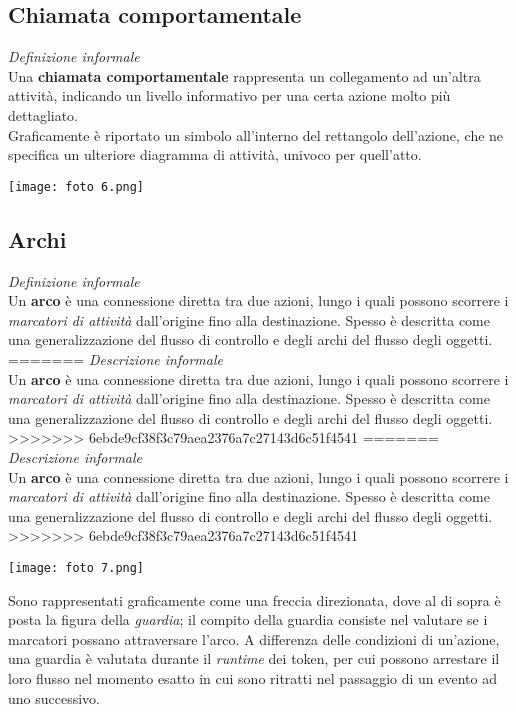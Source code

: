 \documentclass{article}
\begin{document}
\subsection*{Chiamata comportamentale}
\large
\textit{Definizione informale}\\Una \textbf{chiamata comportamentale} rappresenta un collegamento ad un'altra attività, indicando un livello informativo per una certa azione molto più dettagliato.\vspace*{14pt}\\
Graficamente è riportato un simbolo all'interno del rettangolo dell'azione, che ne specifica un ulteriore diagramma di attività, univoco per quell'atto.\\
\begin{center}
    \texttt{[image: foto 6.png]}
\end{center}

\subsection*{Archi}
\large
\textit{Definizione informale}\\Un \textbf{arco} è una connessione diretta tra due azioni, lungo i quali possono scorrere i \textit{marcatori di attività} dall'origine fino alla destinazione. Spesso è descritta come una generalizzazione del flusso di controllo e degli archi del flusso degli oggetti.\\
=======
\textit{Descrizione informale}\\Un \textbf{arco} è una connessione diretta tra due azioni, lungo i quali possono scorrere i \textit{marcatori di attività} dall'origine fino alla destinazione. Spesso è descritta come una generalizzazione del flusso di controllo e degli archi del flusso degli oggetti.\\
>>>>>>> 6ebde9cf38f3c79aea2376a7c27143d6c51f4541
=======
\textit{Descrizione informale}\\Un \textbf{arco} è una connessione diretta tra due azioni, lungo i quali possono scorrere i \textit{marcatori di attività} dall'origine fino alla destinazione. Spesso è descritta come una generalizzazione del flusso di controllo e degli archi del flusso degli oggetti.\\
>>>>>>> 6ebde9cf38f3c79aea2376a7c27143d6c51f4541
\begin{center}
    \texttt{[image: foto 7.png]}
\end{center}
Sono rappresentati graficamente come una freccia direzionata, dove al di sopra è posta la figura della \textit{guardia}; il compito della guardia consiste nel valutare se i marcatori possano attraversare l'arco. A differenza delle condizioni di un'azione, una guardia è valutata durante il \textit{runtime} dei token, per cui possono arrestare il loro flusso nel momento esatto in cui sono ritratti nel passaggio di un evento ad uno successivo.
\end{document}
